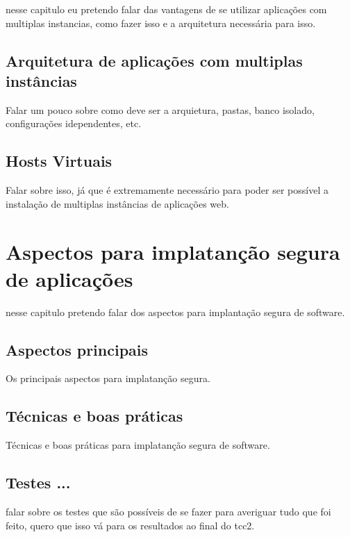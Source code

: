 nesse capitulo eu pretendo falar das vantagens de se utilizar aplicações com
multiplas instancias, como fazer isso e a arquitetura necessária para isso.

\subsection{Arquitetura de aplicações com multiplas instâncias}

Falar um pouco sobre como deve ser a arquietura, pastas, banco isolado,
configurações idependentes, etc.

\subsection{Hosts Virtuais}

Falar sobre isso, já que é extremamente necessário para poder ser possível a
instalação de multiplas instâncias de aplicações web.



\section{Aspectos para implatanção segura de aplicações}
\label{cap-seguranca}

nesse capitulo pretendo falar dos aspectos para implantação segura de software.

\subsection{Aspectos principais}

Os principais aspectos para implatanção segura.

\subsection{Técnicas e boas práticas}

Técnicas e boas práticas para implatanção segura de software.

\subsection{Testes ...}

falar sobre os testes que são possíveis de se fazer para averiguar tudo que foi
feito, quero que isso vá para os resultados ao final do tcc2.

%
